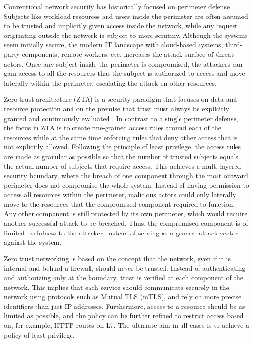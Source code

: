 \documentclass[english, 12pt, a4paper, sci, utf8, a-2b, online]{aaltothesis}
\begin{document}
Conventional network security has historically focused on perimeter defense \cite{kerman2020implementing}.
Subjects like workload resources and users inside the perimeter are often assumed to be trusted and implicitly given access inside the network, while any request originating outside the network is subject to more scrutiny.
Although the systems seem initially secure, the modern IT landscape with cloud-based systems, third-party components, remote workers, etc. increases the attack surface of threat actors.
Once any subject inside the perimeter is compromised, the attackers can gain access to all the resources that the subject is authorized to access and move laterally within the perimeter, escalating the attack on other resources.

Zero trust architecture (ZTA) is a security paradigm that focuses on data and resource protection and on the premise that trust must always be explicitly granted and continuously evaluated \cite{kerman2020implementing, rose2020zero}.
In contrast to a single perimeter defense, the focus in ZTA is to create fine-grained access rules around each of the resources while at the same time enforcing rules that deny other access that is not explicitly allowed.
Following the principle of least privilege, the access rules are made as granular as possible so that the number of trusted subjects equals the actual number of subjects that require access.
This achieves a multi-layered security boundary, where the breach of one component through the most outward perimeter does not compromise the whole system.
Instead of having permission to access all resources within the perimeter, malicious actors could only laterally move to the resources that the compromised component required to function.
Any other component is still protected by its own perimeter, which would require another successful attack to be breached.
Thus, the compromised component is of limited usefulness to the attacker, instead of serving as a general attack vector against the system.

Zero trust networking is based on the concept that the network, even if it is internal and behind a firewall, should never be trusted.
Instead of authenticating and authorizing only at the boundary, trust is verified at each component of the network.
This implies that each service should communicate securely in the network using protocols such as Mutual TLS (mTLS), and rely on more precise identifiers than just IP addresses.
Furthermore, access to a resource should be as limited as possible, and the policy can be further refined to restrict access based on, for example, HTTP routes on L7.
The ultimate aim in all cases is to achieve a policy of least privilege.
\end{document}
